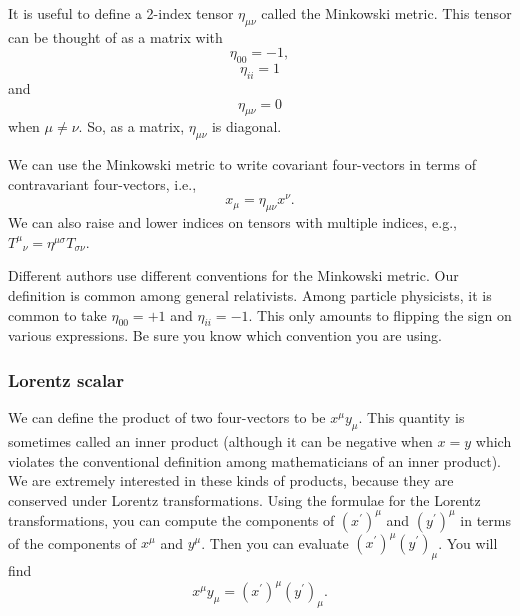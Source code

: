 \documentclass{article}
\begin{document}
It is useful to define a 2-index tensor $\eta_{\mu \nu}$ called the Minkowski metric. This tensor can be thought of as a matrix with \begin{equation} \eta_{00} = -1 ,\end{equation} \begin{equation} \eta_{ii} = 1 \end{equation} and \begin{equation} \eta_{\mu \nu} = 0 \end{equation} when $\mu \not = \nu$. So, as a matrix, $\eta_{\mu \nu}$ is diagonal.

We can use the Minkowski metric to write covariant four-vectors in terms of contravariant four-vectors, i.e., \begin{equation} x_\mu = \eta_{\mu \nu} x^\nu . \end{equation} We can also raise and lower indices on tensors with multiple indices, e.g., $T^\mu_{\,\,\,\, \nu} = \eta^{\mu \sigma} T_{\sigma \nu}$.

Different authors use different conventions for the Minkowski metric. Our definition is common among general relativists. Among particle physicists, it is common to take $\eta_{00} = +1$ and $\eta_{ii} = -1$. This only amounts to flipping the sign on various expressions. Be sure you know which convention you are using.

\subsubsection*{Lorentz scalar}

We can define the product of two four-vectors to be $x^\mu y_\mu$. This quantity is sometimes called an inner product (although it can be negative when $x = y$ which violates the conventional definition among mathematicians of an inner product). We are extremely interested in these kinds of products, because they are conserved under Lorentz transformations. Using the formulae for the Lorentz transformations, you can compute the components of $(x^\prime)^\mu$ and $(y^\prime)^\mu$ in terms of the components of $x^\mu$ and $y^\mu$. Then you can evaluate $(x^\prime)^\mu (y^\prime)_\mu$. You will find \begin{equation} x^\mu y_\mu = (x^\prime)^\mu (y^\prime)_\mu . \end{equation}
\end{document}
